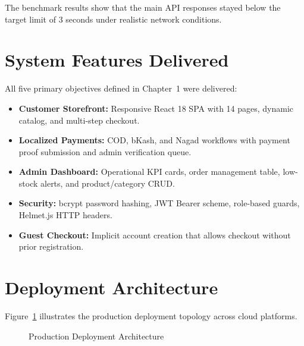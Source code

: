 \documentclass[12pt,a4paper,oneside]{report}
\begin{document}
The benchmark results show that the main API responses stayed below the target limit of 3 seconds under realistic network conditions.

\section{System Features Delivered}
All five primary objectives defined in Chapter~1 were delivered:
\begin{itemize}
    \item \textbf{Customer Storefront:} Responsive React 18 SPA with 14 pages, dynamic catalog, and multi-step checkout.
    \item \textbf{Localized Payments:} COD, bKash, and Nagad workflows with payment proof submission and admin verification queue.
    \item \textbf{Admin Dashboard:} Operational KPI cards, order management table, low-stock alerts, and product/category CRUD.
    \item \textbf{Security:} bcrypt password hashing, JWT Bearer scheme, role-based guards, Helmet.js HTTP headers.
    \item \textbf{Guest Checkout:} Implicit account creation that allows checkout without prior registration.
\end{itemize}

\section{Deployment Architecture}
Figure~\ref{fig:deployment} illustrates the production deployment topology across cloud platforms.

\begin{figure}[H]
\centering
{}
\caption{Production Deployment Architecture}
\label{fig:deployment}
\end{figure}
\end{document}
